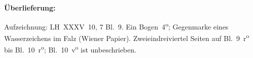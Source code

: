 %  
%
%				
%
%
%   
%
%
%
%
%
%
%
\frenchspacing
%
\begin{ledgroupsized}[r]{120mm}
\footnotesize
\pstart
\noindent\textbf{Überlieferung:}
\pend
\end{ledgroupsized}
%
\begin{ledgroupsized}[r]{114mm}
\footnotesize
\pstart \parindent -6mm
%
Aufzeichnung:
LH~XXXV~10, 7 Bl.~9. 
Ein Bogen~4\textsuperscript{o};
Gegenmarke eines Wasserzeichens im Falz (Wiener Papier).
Zweieindreiviertel Seiten auf Bl.~9~r\textsuperscript{o} bis Bl.~10~r\textsuperscript{o}; Bl.~10~v\textsuperscript{o} ist unbeschrieben.
\pend
\end{ledgroupsized}
%
%
\vspace{5mm}
